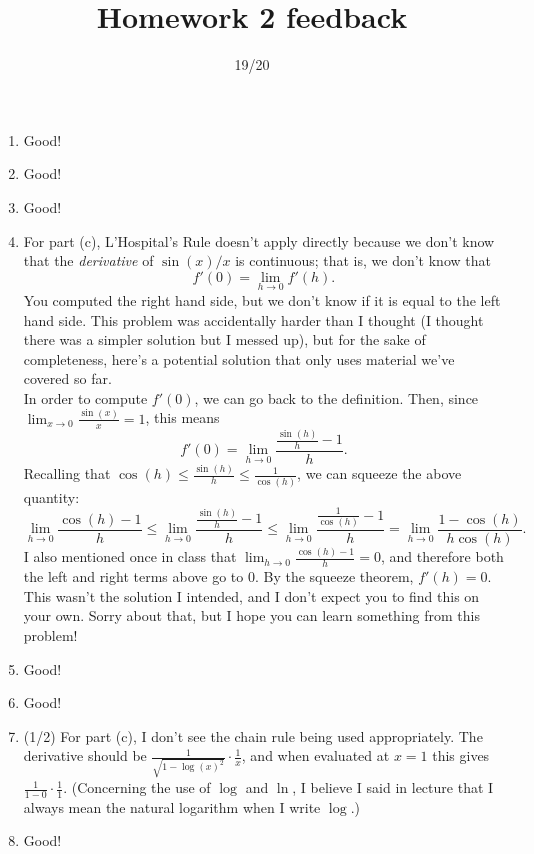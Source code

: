\documentclass{article}
\title{Homework 2 feedback}
\author{19/20}
\date{}
\begin{document}
\maketitle
\begin{enumerate}
	\item Good!
	\item Good!
	\item Good!
	\item For part (c), L'Hospital's Rule doesn't apply directly because we don't know that the \emph{derivative} of $\sin(x)/x$ is continuous; that is, we don't know that
		\[
			f'(0) = \lim_{h \to 0} f'(h).
		\]
		You computed the right hand side, but we don't know if it is equal to the left hand side. This problem was accidentally harder than I thought (I thought there was a simpler solution but I messed up), but for the sake of completeness, here's a potential solution that only uses material we've covered so far.\\

		In order to compute $f'(0)$, we can go back to the definition. Then, since $\lim_{x \to 0} \frac{\sin(x)}{x} = 1$, this means
		\[
			f'(0) = \lim_{h \to 0} \frac{\frac{\sin(h)}{h} - 1}{h}.
		\]
		Recalling that $\cos(h) \leq \frac{\sin(h)}{h} \leq \frac{1}{\cos(h)}$, we can squeeze the above quantity:
		\[
			\lim_{h \to 0} \frac{\cos(h) - 1}{h} \leq \lim_{h \to 0} \frac{\frac{\sin(h)}{h} - 1}{h} \leq \lim_{h \to 0} \frac{\frac{1}{\cos(h)}-1}{h} = \lim_{h \to 0} \frac{1 - \cos(h)}{h \cos(h)}.
		\]
		I also mentioned once in class that $\lim_{h \to 0} \frac{\cos(h) - 1}{h} = 0$, and therefore both the left and right terms above go to 0. By the squeeze theorem, $f'(h) = 0$. This wasn't the solution I intended, and I don't expect you to find this on your own. Sorry about that, but I hope you can learn something from this problem!
	\item Good!
	\item Good! 
	\item (1/2) For part (c), I don't see the chain rule being used appropriately. The derivative should be $\frac{1}{\sqrt{1 - \log(x)^{2}}} \cdot \frac{1}{x}$, and when evaluated at $x=1$ this gives $\frac{1}{1 - 0 }\cdot \frac{1}{1}$. (Concerning the use of $\log$ and $\ln$, I believe I said in lecture that I always mean the natural logarithm when I write $\log$.)
	\item Good!
\end{enumerate}
\end{document}
